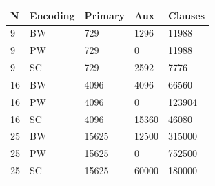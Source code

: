 \begin{tabular}{lllll}
\hline
N & Encoding & Primary & Aux & Clauses \\
\hline
9 & BW & 729 & 1296 & 11988 \\
9 & PW & 729 & 0 & 11988 \\
9 & SC & 729 & 2592 & 7776 \\
16 & BW & 4096 & 4096 & 66560 \\
16 & PW & 4096 & 0 & 123904 \\
16 & SC & 4096 & 15360 & 46080 \\
25 & BW & 15625 & 12500 & 315000 \\
25 & PW & 15625 & 0 & 752500 \\
25 & SC & 15625 & 60000 & 180000 \\
\hline
\end{tabular}
